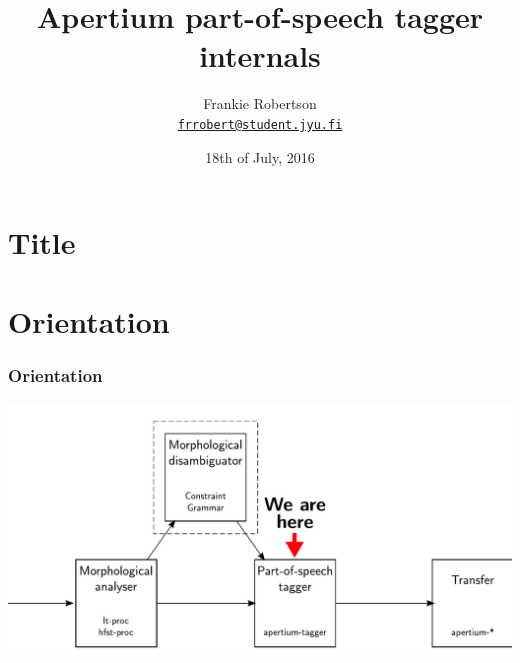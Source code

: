 \documentclass{beamer}
\title[POS tagger internals]{Apertium part-of-speech tagger internals}
\institute[JYU]{University of Jyväskylä\\
\vspace{5mm}
\url{https://www.github.com/frankier/tagger-internals-slides/}}
\author[Frankie Robertson]{Frankie Robertson\texorpdfstring{\\
\href{mailto:frrobert@student.jyu.fi}{\texttt{frrobert@student.jyu.fi}}}{}}
\date{18th of July, 2016}
\begin{document}
\section{Title}
\begin{frame}
  \titlepage{}
\end{frame}

\section{Orientation}
\begin{frame}
\frametitle{Orientation}
\hspace*{-5mm}
\includegraphics[width=\paperwidth]{we-are-here.pdf}
\end{frame}
\end{document}
